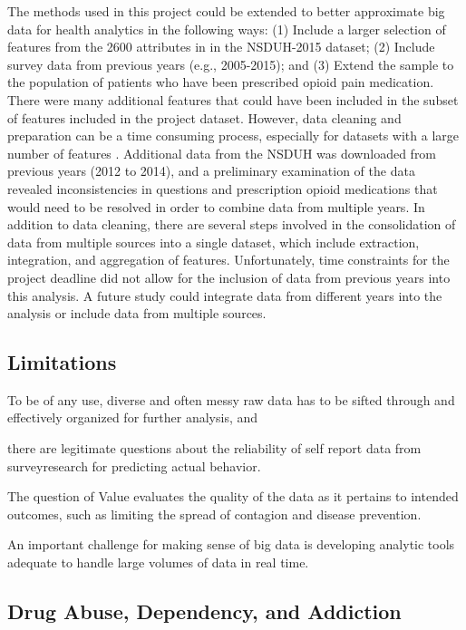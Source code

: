 \documentclass[sigconf]{acmart}
\begin{document}
The methods used in this project could be extended to better approximate 
big data for health analytics in the following ways: (1) Include a larger 
selection of features from the 2600 attributes in in the NSDUH-2015 dataset; 
(2) Include survey data from previous years (e.g., 2005-2015); and (3) 
Extend the sample to the population of patients who have been prescribed 
opioid pain medication. There were many additional features that could have
been included in the subset of features included in the project dataset. 
However, data cleaning and preparation can be a time consuming process, 
especially for datasets with a large number of features \cite{rahm00}. 
Additional data from the NSDUH was downloaded from previous years (2012 to 
2014), and a preliminary examination of the data revealed inconsistencies 
in questions and prescription opioid medications that would need to be 
resolved in order to combine data from multiple years. In addition to data 
cleaning, there are several steps involved in the consolidation of data from 
multiple sources into a single dataset, which include extraction, integration, 
and aggregation of features. Unfortunately, time constraints for the project 
deadline did not allow for the inclusion of data from previous years into this 
analysis. A future study could integrate data from different years into the
analysis or include data from multiple sources. 


\subsection{Limitations}

To be of any use, diverse and often messy raw data has to be sifted through and 
effectively organized for further analysis, and 

there are legitimate questions about the reliability of self report data from 
surveyresearch for predicting actual behavior. 

The question of Value evaluates the quality of the data as it pertains to 
intended outcomes, such as limiting the spread of contagion and disease 
prevention. 

An important challenge for making sense of big data is developing analytic 
tools adequate to handle large volumes of data in real time.

\subsection{Drug Abuse, Dependency, and Addiction}
\end{document}
